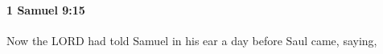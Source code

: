 
		\paragraph{1 Samuel 9:15} %
			\label{1SAMUEL-9-15}

			Now the LORD had told Samuel in his ear a day before Saul came, saying,


